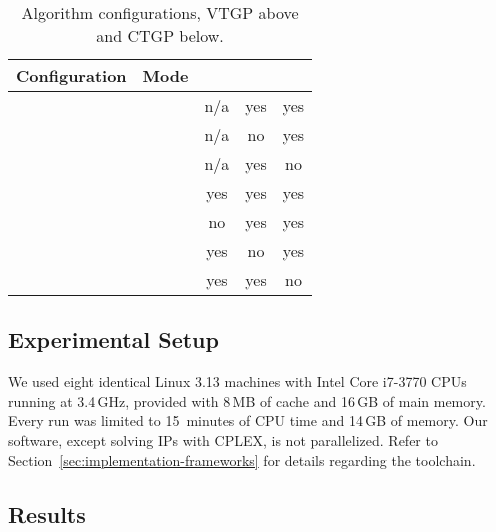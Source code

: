 \begin{table}
	\centering
	\small
	\begin{tabular}{|l|c|c|c|c|}
		\hline
		Configuration & Mode & \pointguardfilter & \domfilter & \witnessfilter \\
		\hline
		\hline
		\vdefault & \vertexguardmode & n/a & yes & yes \\
		\hline
		\vnodom   & \vertexguardmode & n/a &  no & yes \\
		\hline
		\vnow     & \vertexguardmode & n/a & yes &  no \\
		\hline
		\hline
		\pdefault & \pointguardmode  & yes & yes & yes \\
		\hline
		\pnoedge  & \pointguardmode  &  no & yes & yes \\
		\hline
		\pnodom   & \pointguardmode  & yes &  no & yes \\
		\hline
		\pnow     & \pointguardmode  & yes & yes &  no \\
		\hline
	\end{tabular}
	\caption{Algorithm configurations, \acs{VTGP} above and \acs{CTGP} below.}
	\label{tab:config}
\end{table}

\subsection{Experimental Setup}
\label{sec:experiments-setup}

We used eight identical Linux 3.13 machines with Intel Core i7-3770 CPUs running at 3.4\,GHz, provided with 8\,MB of cache and 16\,GB of main memory.
Every run was limited to 15~minutes of CPU time and 14\,GB of memory.
Our software, except solving \acp{IP} with CPLEX, is not parallelized.
Refer to Section~\ref{sec:implementation-frameworks} for details regarding the toolchain.

\subsection{Results}
\label{sec:experiments-results}

